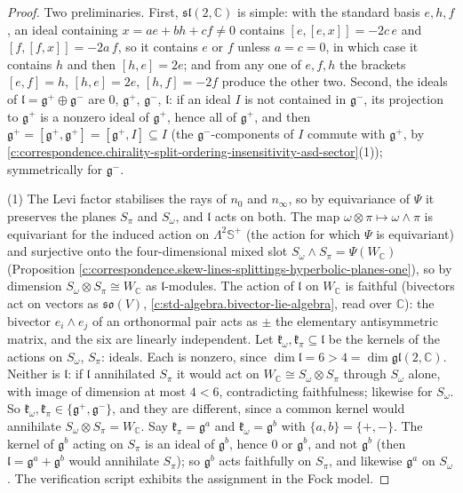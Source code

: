 \documentclass[11pt]{article}
\theoremstyle{definition}
\theoremstyle{plain}
\providecommand{\C}{}\renewcommand{\C}{\mathbb{C}}
\providecommand{\CS}{}\renewcommand{\CS}{{\mathbb{S}^{+}}}
\providecommand{\Som}{}\renewcommand{\Som}{S_\omega}
\providecommand{\Spi}{}\renewcommand{\Spi}{S_\pi}
\providecommand{\nInf}{}\renewcommand{\nInf}{n_\infty}
\providecommand{\nO}{}\renewcommand{\nO}{n_0}
\providecommand{\so}{}\renewcommand{\so}{\mathfrak{so}}
\begin{document}
\begin{proof}
Two preliminaries. First, $\mathfrak{sl}(2,\C)$ is simple: with the standard basis $e, h, f$, an ideal containing $x = ae + bh + cf \neq 0$ contains $[e,[e,x]] = -2c\,e$ and $[f,[f,x]] = -2a\,f$, so it contains $e$ or $f$ unless $a = c = 0$, in which case it contains $h$ and then $[h,e] = 2e$; and from any one of $e, f, h$ the brackets $[e,f] = h$, $[h,e] = 2e$, $[h,f] = -2f$ produce the other two. Second, the ideals of $\mathfrak{l} = \mathfrak{g}^+\oplus\mathfrak{g}^-$ are $0$, $\mathfrak{g}^+$, $\mathfrak{g}^-$, $\mathfrak{l}$: if an ideal $I$ is not contained in $\mathfrak{g}^-$, its projection to $\mathfrak{g}^+$ is a nonzero ideal of $\mathfrak{g}^+$, hence all of $\mathfrak{g}^+$, and then $\mathfrak{g}^+ = [\mathfrak{g}^+, \mathfrak{g}^+] = [\mathfrak{g}^+, I] \subseteq I$ (the $\mathfrak{g}^-$-components of $I$ commute with $\mathfrak{g}^+$, by \ref{c:correspondence.chirality-split-ordering-insensitivity-asd-sector}(1)); symmetrically for $\mathfrak{g}^-$.

(1) The Levi factor stabilises the rays of $\nO$ and $\nInf$, so by equivariance of $\Psi$ it preserves the planes $\Spi$ and $\Som$, and $\mathfrak{l}$ acts on both. The map $\omega\otimes\pi \mapsto \omega\wedge\pi$ is equivariant for the induced action on $\Lambda^2\CS$ (the action for which $\Psi$ is equivariant) and surjective onto the four-dimensional mixed slot $\Som\wedge\Spi = \Psi(W_\C)$ (Proposition \ref{c:correspondence.skew-lines-splittings-hyperbolic-planes-one}), so by dimension $\Som\otimes\Spi \cong W_\C$ as $\mathfrak{l}$-modules. The action of $\mathfrak{l}$ on $W_\C$ is faithful (bivectors act on vectors as $\so(V)$, \ref{c:std-algebra.bivector-lie-algebra}, read over $\C$): the bivector $e_i\wedge e_j$ of an orthonormal pair acts as $\pm$ the elementary antisymmetric matrix, and the six are linearly independent. Let $\mathfrak{k}_\omega, \mathfrak{k}_\pi \subseteq \mathfrak{l}$ be the kernels of the actions on $\Som$, $\Spi$: ideals. Each is nonzero, since $\dim\mathfrak{l} = 6 > 4 = \dim\mathfrak{gl}(2,\C)$. Neither is $\mathfrak{l}$: if $\mathfrak{l}$ annihilated $\Spi$ it would act on $W_\C \cong \Som\otimes\Spi$ through $\Som$ alone, with image of dimension at most $4 < 6$, contradicting faithfulness; likewise for $\Som$. So $\mathfrak{k}_\omega, \mathfrak{k}_\pi \in \{\mathfrak{g}^+, \mathfrak{g}^-\}$, and they are different, since a common kernel would annihilate $\Som\otimes\Spi = W_\C$. Say $\mathfrak{k}_\pi = \mathfrak{g}^a$ and $\mathfrak{k}_\omega = \mathfrak{g}^b$ with $\{a, b\} = \{+,-\}$. The kernel of $\mathfrak{g}^b$ acting on $\Spi$ is an ideal of $\mathfrak{g}^b$, hence $0$ or $\mathfrak{g}^b$, and not $\mathfrak{g}^b$ (then $\mathfrak{l} = \mathfrak{g}^a + \mathfrak{g}^b$ would annihilate $\Spi$); so $\mathfrak{g}^b$ acts faithfully on $\Spi$, and likewise $\mathfrak{g}^a$ on $\Som$. The verification script exhibits the assignment in the Fock model.


\end{proof}
\end{document}
